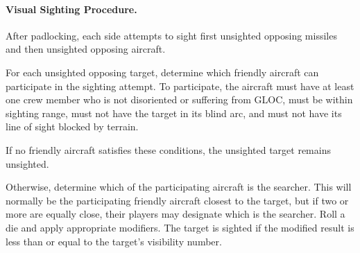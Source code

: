 {\paragraph{Visual Sighting Procedure.}

After padlocking, each side attempts to sight first unsighted opposing missiles and then unsighted opposing aircraft.

For each unsighted opposing target, determine which friendly aircraft can participate in the sighting attempt. To participate, the aircraft must have at least one crew member who is not disoriented or suffering from GLOC, must be within sighting range, must not have the target in its blind arc, and must not have its line of sight blocked by terrain. 

If no friendly aircraft satisfies these conditions, the unsighted target remains unsighted.

Otherwise, determine which of the participating aircraft is the searcher. This will normally be the participating friendly aircraft closest to the target, but if two or more are equally close, their players may designate which is the searcher. Roll a die and apply appropriate modifiers. The target is sighted if the modified result is less than or equal to the target's visibility number.


}



